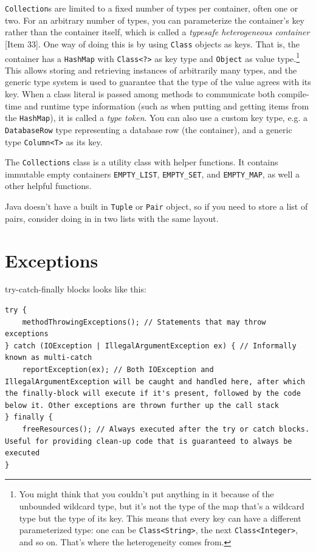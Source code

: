 \documentclass[table, xcdraw]{article}%
\begin{document}
\texttt{Collection}s are limited to a fixed number of types per container, often one or two. For an arbitrary number of types, you can parameterize the container's key rather than the container itself, which is called a \emph{typesafe heterogeneous container} [Item 33]. One way of doing this is by using \texttt{Class} objects as keys. That is, the container has a \texttt{HashMap} with \texttt{Class<?>} as key type and \texttt{Object} as value type.\footnote{You might think that you couldn't put anything in it because of the unbounded wildcard type, but it's not the type of the map that's a wildcard type but the type of its key. This means that every key can have a different parameterized type: one can be \texttt{Class<String>}, the next \texttt{Class<Integer>}, and so on. That's where the heterogeneity comes from.} This allows storing and retrieving instances of arbitrarily many types, and the generic type system is used to guarantee that the type of the value agrees with its key. When a class literal is passed among methods to communicate both compile-time and runtime type information (such as when putting and getting items from the \texttt{HashMap}), it is called a \emph{type token}. You can also use a custom key type, e.g. a \texttt{DatabaseRow} type representing a database row (the container), and a generic type \texttt{Column<T>} as its key.

The \texttt{Collections} class is a utility class with helper functions. It contains immutable empty containers \texttt{EMPTY_LIST}, \texttt{EMPTY_SET}, and \texttt{EMPTY_MAP}, as well a other helpful functions.

Java doesn't have a built in \texttt{Tuple} or \texttt{Pair} object, so if you need to store a list of pairs, consider doing in in two lists with the same layout.

\section{Exceptions}

try-catch-finally blocks looks like this:

\begin{verbatim}
try {
    methodThrowingExceptions(); // Statements that may throw exceptions
} catch (IOException | IllegalArgumentException ex) { // Informally known as multi-catch
    reportException(ex); // Both IOException and IllegalArgumentException will be caught and handled here, after which the finally-block will execute if it's present, followed by the code below it. Other exceptions are thrown further up the call stack
} finally {
    freeResources(); // Always executed after the try or catch blocks. Useful for providing clean-up code that is guaranteed to always be executed
}
\end{verbatim}
\end{document}
